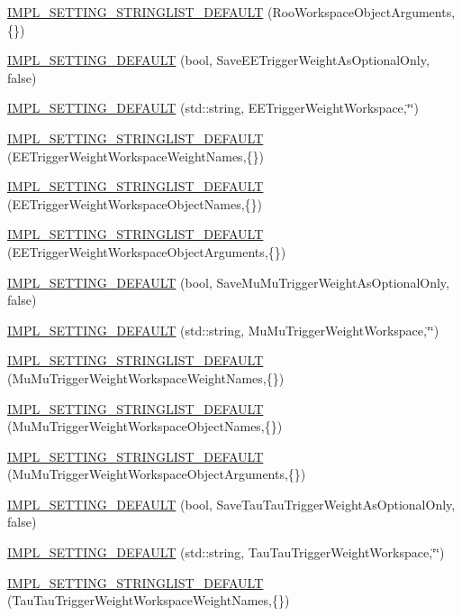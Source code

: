 \begin{DoxyCompactItemize}
\item 
\hyperlink{classHttSettings_aab59102695ddf2fa3f151627b385e0c6}{IMPL\_\-SETTING\_\-STRINGLIST\_\-DEFAULT} (RooWorkspaceObjectArguments,\{\})
\item 
\hyperlink{classHttSettings_ac00e304a4e11243e33168edf333e61d5}{IMPL\_\-SETTING\_\-DEFAULT} (bool, SaveEETriggerWeightAsOptionalOnly, false)
\item 
\hyperlink{classHttSettings_a53af2d1183b8dc100d05a54b1a5568ec}{IMPL\_\-SETTING\_\-DEFAULT} (std::string, EETriggerWeightWorkspace,\char`\"{}\char`\"{})
\item 
\hyperlink{classHttSettings_a8d7748f74329a8eca5f2574b4cd9ecb8}{IMPL\_\-SETTING\_\-STRINGLIST\_\-DEFAULT} (EETriggerWeightWorkspaceWeightNames,\{\})
\item 
\hyperlink{classHttSettings_aef75c48c8c9dfd3d5059332be5635d1d}{IMPL\_\-SETTING\_\-STRINGLIST\_\-DEFAULT} (EETriggerWeightWorkspaceObjectNames,\{\})
\item 
\hyperlink{classHttSettings_ad0011b6e8ff267281a933dd3505eba33}{IMPL\_\-SETTING\_\-STRINGLIST\_\-DEFAULT} (EETriggerWeightWorkspaceObjectArguments,\{\})
\item 
\hyperlink{classHttSettings_a0477d9837718fbff577da0e7c46e1727}{IMPL\_\-SETTING\_\-DEFAULT} (bool, SaveMuMuTriggerWeightAsOptionalOnly, false)
\item 
\hyperlink{classHttSettings_abf46321a9b0e9b722230dee789746fe7}{IMPL\_\-SETTING\_\-DEFAULT} (std::string, MuMuTriggerWeightWorkspace,\char`\"{}\char`\"{})
\item 
\hyperlink{classHttSettings_afb45142a29386e30d75085c0fcb95607}{IMPL\_\-SETTING\_\-STRINGLIST\_\-DEFAULT} (MuMuTriggerWeightWorkspaceWeightNames,\{\})
\item 
\hyperlink{classHttSettings_aed2ac5e09cc936ae32ab26abb998b025}{IMPL\_\-SETTING\_\-STRINGLIST\_\-DEFAULT} (MuMuTriggerWeightWorkspaceObjectNames,\{\})
\item 
\hyperlink{classHttSettings_a4ed979f31a66000c717db31d40241bae}{IMPL\_\-SETTING\_\-STRINGLIST\_\-DEFAULT} (MuMuTriggerWeightWorkspaceObjectArguments,\{\})
\item 
\hyperlink{classHttSettings_af06ee6db5e66d375f02cdb462ad0109a}{IMPL\_\-SETTING\_\-DEFAULT} (bool, SaveTauTauTriggerWeightAsOptionalOnly, false)
\item 
\hyperlink{classHttSettings_a6cacd94282f306dcc378783dae8f193f}{IMPL\_\-SETTING\_\-DEFAULT} (std::string, TauTauTriggerWeightWorkspace,\char`\"{}\char`\"{})
\item 
\hyperlink{classHttSettings_a6642e7c88f78f3a77c7fe8f27913cb08}{IMPL\_\-SETTING\_\-STRINGLIST\_\-DEFAULT} (TauTauTriggerWeightWorkspaceWeightNames,\{\})

\end{DoxyCompactItemize}
